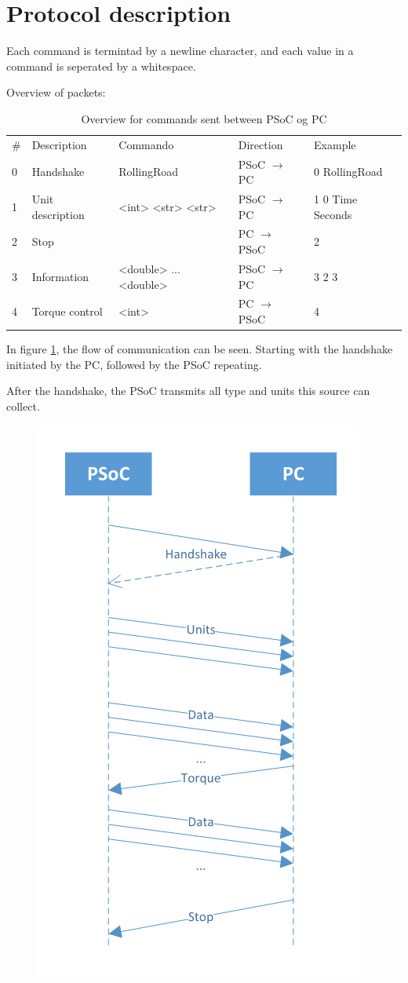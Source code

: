 \section{Protocol description}

Each command is termintad by a newline character, and each value in a command is seperated by a whitespace.

Overview of packets:
\begin{table}[h!]
	\centering
	\label{Protocol:overview}
	\begin{tabular}{lllll}
		\# & Description 		& Commando    		& Direction             & Example     		\\
		0  & Handshake   		& RollingRoad 		& PSoC $\rightarrow$ PC & 0 RollingRoad 	\\
		1  & Unit description 	& <int> <str> <str> & PSoC $\rightarrow$ PC & 1 0 Time Seconds 	\\
		2  & Stop        		&            		& PC $\rightarrow$ PSoC	& 2        			\\
		3  & Information 		& <double> ... <double>	& PSoC $\rightarrow$ PC & 3 2 3 	    	\\
		4  & Torque control 	& <int>    			& PC $\rightarrow$ PSoC & 4    				\\
	\end{tabular}
	\caption{Overview for commands sent between PSoC og PC}
\end{table}

In figure \ref{fig:TimingDiagram}, the flow of communication can be seen. Starting with the handshake initiated by the PC, followed by the PSoC repeating.

After the handshake, the PSoC transmits all type and units this source can collect.

\begin{figure}
\centering
\includegraphics[width=0.5\linewidth]{Protocol/TimingDiagram}
\caption{}
\label{fig:TimingDiagram}
\end{figure}

